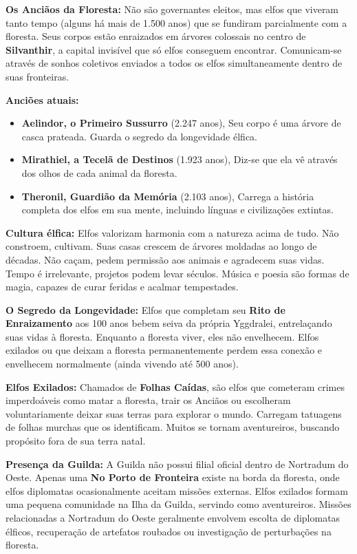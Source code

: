 \textbf{\ringmfamily Os Anciãos da Floresta:} Não são governantes eleitos, mas elfos que viveram tanto tempo (alguns há mais de 1.500 anos) que se fundiram parcialmente com a floresta. Seus corpos estão enraizados em árvores colossais no centro de \textbf{Silvanthir}, a capital invisível que só elfos conseguem encontrar. Comunicam-se através de sonhos coletivos enviados a todos os elfos simultaneamente dentro de suas fronteiras.

\textbf{\ringmfamily Anciões atuais:}
\begin{itemize}
    \item \textbf{\ringmfamily Aelindor, o Primeiro Sussurro} (2.247 anos), Seu corpo é uma árvore de casca prateada. Guarda o segredo da longevidade élfica.
    \item \textbf{\ringmfamily Mirathiel, a Tecelã de Destinos} (1.923 anos), Diz-se que ela vê através dos olhos de cada animal da floresta.
    \item \textbf{\ringmfamily Theronil, Guardião da Memória} (2.103 anos), Carrega a história completa dos elfos em sua mente, incluindo línguas e civilizações extintas.
\end{itemize}

\textbf{\ringmfamily Cultura élfica:} Elfos valorizam harmonia com a natureza acima de tudo. Não constroem, cultivam. Suas casas crescem de árvores moldadas ao longo de décadas. Não caçam, pedem permissão aos animais e agradecem suas vidas. Tempo é irrelevante, projetos podem levar séculos. Música e poesia são formas de magia, capazes de curar feridas e acalmar tempestades.

\textbf{\ringmfamily O Segredo da Longevidade:} Elfos que completam seu \textbf{Rito de Enraizamento} aos 100 anos bebem seiva da própria Yggdralei, entrelaçando suas vidas à floresta. Enquanto a floresta viver, eles não envelhecem. Elfos exilados ou que deixam a floresta permanentemente perdem essa conexão e envelhecem normalmente (ainda vivendo até 500 anos).

\textbf{\ringmfamily Elfos Exilados:} Chamados de \textbf{Folhas Caídas}, são elfos que cometeram crimes imperdoáveis como matar a floresta, trair os Anciãos ou escolheram voluntariamente deixar suas terras para explorar o mundo. Carregam tatuagens de folhas murchas que os identificam. Muitos se tornam aventureiros, buscando propósito fora de sua terra natal.

\textbf{\ringmfamily Presença da Guilda:} A Guilda não possui filial oficial dentro de Nortradum do Oeste. Apenas uma \textbf{No Porto de Fronteira} existe na borda da floresta, onde elfos diplomatas ocasionalmente aceitam missões externas. Elfos exilados formam uma pequena comunidade na Ilha da Guilda, servindo como aventureiros. Missões relacionadas a Nortradum do Oeste geralmente envolvem escolta de diplomatas élficos, recuperação de artefatos roubados ou investigação de perturbações na floresta.

